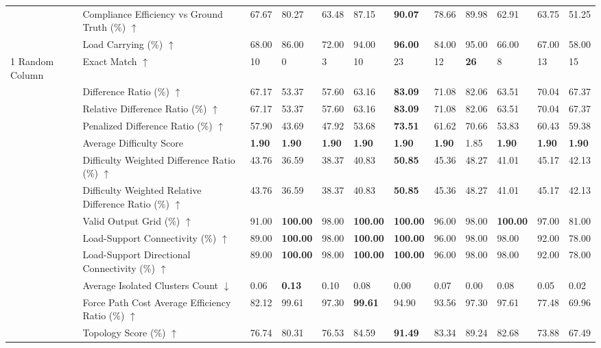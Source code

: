\begin{table}[!h]
{\begin{tabular}{llllllllllll}
 & Compliance Efficiency vs Ground Truth (\%) $\uparrow$ & 67.67 & 80.27 & 63.48 & 87.15 & \textbf{90.07} & 78.66 & 89.98 & 62.91 & 63.75 & 51.25 \\
 & Load Carrying (\%) $\uparrow$ & 68.00 & 86.00 & 72.00 & 94.00 & \textbf{96.00} & 84.00 & 95.00 & 66.00 & 67.00 & 58.00 \\
1 Random Column & Exact Match $\uparrow$ & 10 & 0 & 3 & 10 & 23 & 12 & \textbf{26} & 8 & 13 & 15 \\
 & Difference Ratio (\%) $\uparrow$ & 67.17 & 53.37 & 57.60 & 63.16 & \textbf{83.09} & 71.08 & 82.06 & 63.51 & 70.04 & 67.37 \\
 & Relative Difference Ratio (\%) $\uparrow$ & 67.17 & 53.37 & 57.60 & 63.16 & \textbf{83.09} & 71.08 & 82.06 & 63.51 & 70.04 & 67.37 \\
 & Penalized Difference Ratio (\%) $\uparrow$ & 57.90 & 43.69 & 47.92 & 53.68 & \textbf{73.51} & 61.62 & 70.66 & 53.83 & 60.43 & 59.38 \\
 & Average Difficulty Score & \textbf{1.90} & \textbf{1.90} & \textbf{1.90} & \textbf{1.90} & \textbf{1.90} & \textbf{1.90} & 1.85 & \textbf{1.90} & \textbf{1.90} & \textbf{1.90} \\
 & Difficulty Weighted Difference Ratio (\%) $\uparrow$ & 43.76 & 36.59 & 38.37 & 40.83 & \textbf{50.85} & 45.36 & 48.27 & 41.01 & 45.17 & 42.13 \\
 & Difficulty Weighted Relative Difference Ratio (\%) $\uparrow$ & 43.76 & 36.59 & 38.37 & 40.83 & \textbf{50.85} & 45.36 & 48.27 & 41.01 & 45.17 & 42.13 \\
 & Valid Output Grid (\%) $\uparrow$ & 91.00 & \textbf{100.00} & 98.00 & \textbf{100.00} & \textbf{100.00} & 96.00 & 98.00 & \textbf{100.00} & 97.00 & 81.00 \\
 & Load-Support Connectivity (\%) $\uparrow$ & 89.00 & \textbf{100.00} & 98.00 & \textbf{100.00} & \textbf{100.00} & 96.00 & 98.00 & 98.00 & 92.00 & 78.00 \\
 & Load-Support Directional Connectivity (\%) $\uparrow$ & 89.00 & \textbf{100.00} & 98.00 & \textbf{100.00} & \textbf{100.00} & 96.00 & 98.00 & 98.00 & 92.00 & 78.00 \\
 & Average Isolated Clusters Count $\downarrow$ & 0.06 & \textbf{0.13} & 0.10 & 0.08 & 0.00 & 0.07 & 0.00 & 0.08 & 0.05 & 0.02 \\
 & Force Path Cost Average Efficiency Ratio (\%) $\uparrow$ & 82.12 & 99.61 & 97.30 & \textbf{99.61} & 94.90 & 93.56 & 97.30 & 97.61 & 77.48 & 69.96 \\
 & Topology Score (\%) $\uparrow$ & 76.74 & 80.31 & 76.53 & 84.59 & \textbf{91.49} & 83.34 & 89.24 & 82.68 & 73.88 & 67.49 \\

\end{tabular}}
\end{table}
